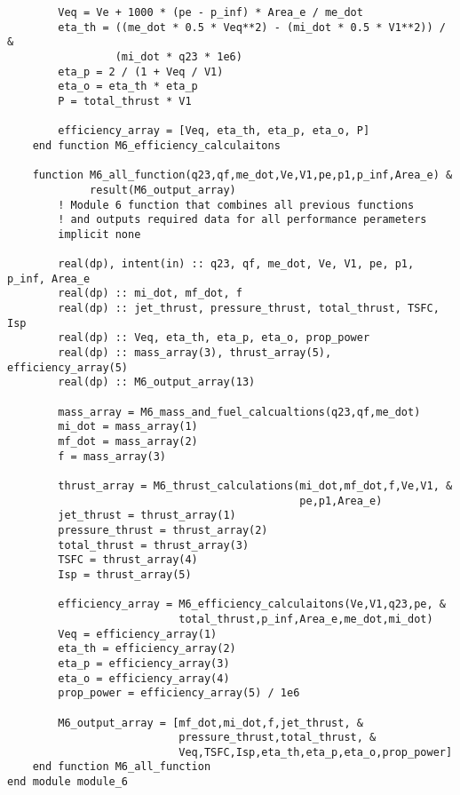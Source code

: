 \begin{verbatim}
        Veq = Ve + 1000 * (pe - p_inf) * Area_e / me_dot
        eta_th = ((me_dot * 0.5 * Veq**2) - (mi_dot * 0.5 * V1**2)) / &
                 (mi_dot * q23 * 1e6)
        eta_p = 2 / (1 + Veq / V1)
        eta_o = eta_th * eta_p
        P = total_thrust * V1

        efficiency_array = [Veq, eta_th, eta_p, eta_o, P]
    end function M6_efficiency_calculaitons
    
    function M6_all_function(q23,qf,me_dot,Ve,V1,pe,p1,p_inf,Area_e) &
             result(M6_output_array)
        ! Module 6 function that combines all previous functions
        ! and outputs required data for all performance perameters
        implicit none

        real(dp), intent(in) :: q23, qf, me_dot, Ve, V1, pe, p1, p_inf, Area_e
        real(dp) :: mi_dot, mf_dot, f
        real(dp) :: jet_thrust, pressure_thrust, total_thrust, TSFC, Isp
        real(dp) :: Veq, eta_th, eta_p, eta_o, prop_power
        real(dp) :: mass_array(3), thrust_array(5), efficiency_array(5)
        real(dp) :: M6_output_array(13)

        mass_array = M6_mass_and_fuel_calcualtions(q23,qf,me_dot)
        mi_dot = mass_array(1)
        mf_dot = mass_array(2)
        f = mass_array(3)

        thrust_array = M6_thrust_calculations(mi_dot,mf_dot,f,Ve,V1, &
                                              pe,p1,Area_e)
        jet_thrust = thrust_array(1)
        pressure_thrust = thrust_array(2)
        total_thrust = thrust_array(3)
        TSFC = thrust_array(4)
        Isp = thrust_array(5)

        efficiency_array = M6_efficiency_calculaitons(Ve,V1,q23,pe, &
                           total_thrust,p_inf,Area_e,me_dot,mi_dot)
        Veq = efficiency_array(1)
        eta_th = efficiency_array(2)
        eta_p = efficiency_array(3)
        eta_o = efficiency_array(4)
        prop_power = efficiency_array(5) / 1e6

        M6_output_array = [mf_dot,mi_dot,f,jet_thrust, &
                           pressure_thrust,total_thrust, &
                           Veq,TSFC,Isp,eta_th,eta_p,eta_o,prop_power]
    end function M6_all_function
end module module_6
\end{verbatim}